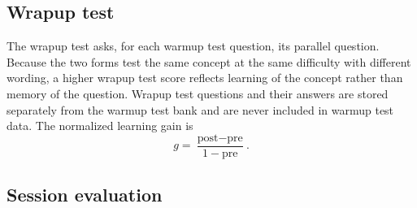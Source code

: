 \subsection{Wrapup test}

The wrapup test asks, for each warmup test question, its parallel question. Because the two forms test the same concept
at the same difficulty with different wording, a higher wrapup test score reflects learning of the concept rather than
memory of the question. Wrapup test questions and their answers are stored separately from the warmup test bank and are
never included in warmup test data. The normalized learning gain is
\begin{equation}
  g = \frac{\text{post} - \text{pre}}{1 - \text{pre}}.
  \label{eq:gain}
\end{equation}

\subsection{Session evaluation}

